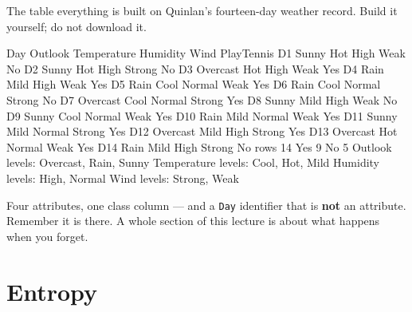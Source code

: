 \documentclass[aspectratio=169]{beamer}
\begin{document}
\begin{frame}[fragile,shrink=16]{The table everything is built on}
Quinlan's fourteen-day weather record. Build it yourself; do not download it.
\begin{outblk}
Day  Outlook   Temperature  Humidity Wind    PlayTennis
D1   Sunny     Hot          High    Weak    No
D2   Sunny     Hot          High    Strong  No
D3   Overcast  Hot          High    Weak    Yes
D4   Rain      Mild         High    Weak    Yes
D5   Rain      Cool         Normal  Weak    Yes
D6   Rain      Cool         Normal  Strong  No
D7   Overcast  Cool         Normal  Strong  Yes
D8   Sunny     Mild         High    Weak    No
D9   Sunny     Cool         Normal  Weak    Yes
D10  Rain      Mild         Normal  Weak    Yes
D11  Sunny     Mild         Normal  Strong  Yes
D12  Overcast  Mild         High    Strong  Yes
D13  Overcast  Hot          Normal  Weak    Yes
D14  Rain      Mild         High    Strong  No
rows 14   Yes 9   No 5
Outlook      levels: Overcast, Rain, Sunny
Temperature  levels: Cool, Hot, Mild
Humidity     levels: High, Normal
Wind         levels: Strong, Weak
\end{outblk}
\begin{center}\small
  Four attributes, one class column --- and a \texttt{Day} identifier that is
  \textbf{not} an attribute. Remember it is there. A whole section of this
  lecture is about what happens when you forget.
\end{center}
\end{frame}

\section{Entropy}
\label{sec:entropy}
\end{document}
